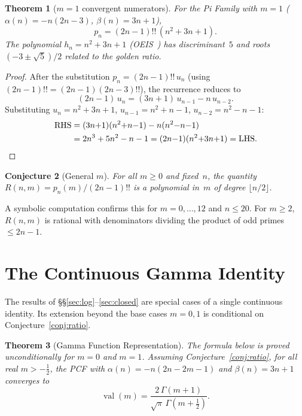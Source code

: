 \documentclass[11pt,a4paper]{article}
\theoremstyle{plain}
\newtheorem{theorem}{Theorem}[section]
\newtheorem{conjecture}[theorem]{Conjecture}
\theoremstyle{definition}
\theoremstyle{remark}
\newcommand{\half}{\tfrac{1}{2}}
\newcommand{\dff}[1]{(#1)!!}
\begin{document}
\begin{theorem}[$m=1$ convergent numerators]\label{thm:conv1}
For the Pi Family with $m=1$ ($\alpha(n) = -n(2n{-}3)$,
$\beta(n) = 3n{+}1$),
\begin{equation}\label{eq:pn_m1}
  p_n = \dff{2n{-}1}\,(n^2 + 3n + 1).
\end{equation}
The polynomial $h_n = n^2{+}3n{+}1$ (OEIS~\cite{oeis_A028387})
has discriminant~$5$ and
roots $(-3 \pm \sqrt{5})/2$ related to the golden ratio.
\end{theorem}

\begin{proof}
After the substitution $p_n = \dff{2n{-}1}\,u_n$
(using $\dff{2n{-}1} = (2n{-}1)\dff{2n{-}3}$),
the recurrence reduces to
\begin{equation}\label{eq:ured}
  (2n{-}1)\,u_n = (3n{+}1)\,u_{n-1} - n\,u_{n-2}.
\end{equation}
Substituting $u_n = n^2{+}3n{+}1$, $u_{n-1} = n^2{+}n{-}1$,
$u_{n-2} = n^2{-}n{-}1$:
\begin{align*}
  \text{RHS} &= (3n{+}1)(n^2{+}n{-}1) - n(n^2{-}n{-}1) \\
  &= 2n^3 + 5n^2 - n - 1
   = (2n{-}1)(n^2{+}3n{+}1) = \text{LHS.}\qedhere
\end{align*}
\end{proof}

\begin{conjecture}[General $m$]\label{conj:Rnm}
For all $m \ge 0$ and fixed~$n$, the quantity
$R(n,m) = p_n(m)/\dff{2n{-}1}$
is a polynomial in~$m$ of degree $\lfloor n/2 \rfloor$.
\end{conjecture}

A symbolic computation confirms this for $m = 0, \ldots, 12$ and $n \le 20$.
For $m \ge 2$, $R(n,m)$ is rational with denominators dividing the
product of odd primes~$\le 2n{-}1$.

\section{The Continuous Gamma Identity}\label{sec:gamma}

The results of \S\S\ref{sec:log}--\ref{sec:closed} are special
cases of a single continuous identity. Its extension beyond the
base cases $m=0,1$ is conditional on Conjecture~\ref{conj:ratio}.

\begin{theorem}[Gamma Function Representation]\label{thm:gamma}
The formula below is proved unconditionally for $m=0$ and $m=1$.
Assuming Conjecture~\ref{conj:ratio}, for all real $m > -\frac{1}{2}$,
the PCF with
$\alpha(n) = -n(2n{-}2m{-}1)$ and $\beta(n) = 3n+1$
converges to
\[
  \operatorname{val}(m)
  = \frac{2\,\Gamma(m{+}1)}{\sqrt{\pi}\,\Gamma(m{+}\half)}.
\]
\end{theorem}
\end{document}
